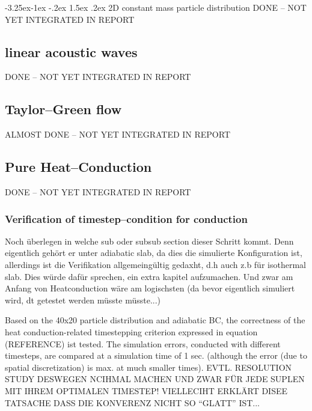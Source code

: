 \documentclass{report}
\makeatletter
\renewcommand\paragraph{\@startsection{paragraph}{4}{\z@}%
  {-3.25ex\@plus -1ex \@minus -.2ex}%
  {1.5ex \@plus .2ex}%
  {\normalfont\normalsize\bfseries}}
\makeatother
\begin{document}
\paragraph{2D constant mass particle distribution}
DONE -- NOT YET INTEGRATED IN REPORT
\subsection{linear acoustic waves}

DONE -- NOT YET INTEGRATED IN REPORT


\subsection{Taylor--Green flow}
ALMOST DONE -- NOT YET INTEGRATED IN REPORT

\subsection{Pure Heat--Conduction}
DONE -- NOT YET INTEGRATED IN REPORT
\subsubsection{Verification of timestep--condition for conduction}
Noch überlegen in welche sub oder subsub section dieser Schritt kommt.
Denn eigentlich gehört er unter adiabatic slab, da dies die simulierte Konfiguration ist, allerdings ist die Verifikation allgemeingültig gedaxht, d.h auch z.b für isothermal slab. Dies würde dafür sprechen, ein extra kapitel aufzumachen. Und zwar am Anfang von Heatconduction wäre am logischsten (da bevor eigentlich simuliert wird, dt getestet werden müsste müsste...)

Based on the 40x20 particle distribution and adiabatic BC, the correctness of the
heat conduction-related timestepping criterion expressed in equation (REFERENCE) ist tested. The simulation errors, conducted with different timesteps, are compared at a simulation time of 1 sec. (although the error (due to spatial discretization) is max. at much smaller times). 
EVTL. RESOLUTION STUDY DESWEGEN NCIHMAL MACHEN UND ZWAR FÜR JEDE SUPLEN MIT IHREM OPTIMALEN TIMESTEP! VIELLECIHT ERKLÄRT DISEE TATSACHE DASS DIE KONVERENZ NICHT SO ``GLATT'' IST...
\end{document}
